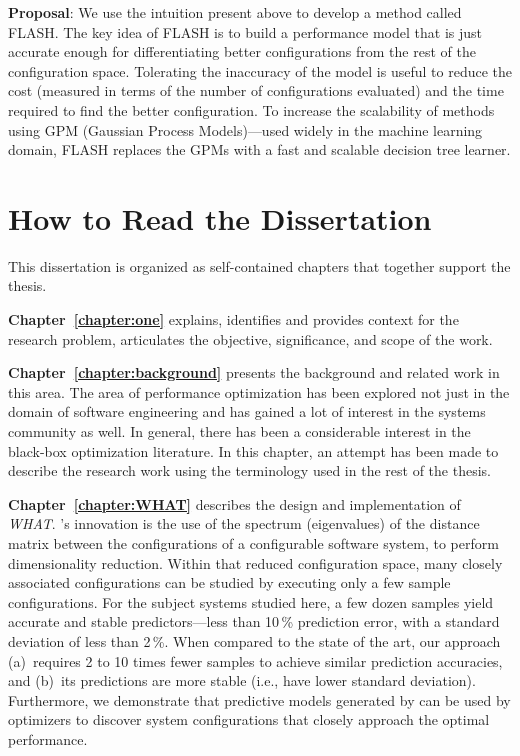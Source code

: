 \noindent\textbf{Proposal}:
We use the intuition present above to develop a method called FLASH.
The key idea of FLASH is to build a performance model
that is just accurate enough for differentiating better configurations
from the rest of the configuration space. Tolerating
the inaccuracy of the model is useful to reduce the cost
(measured in terms of the number of configurations evaluated)
and the time required to find the better configuration.
To increase the scalability of methods using GPM (Gaussian Process Models)---used widely in the machine learning domain, FLASH
replaces the GPMs with a fast and scalable decision tree learner.





\section{How to Read the Dissertation}
This dissertation is organized as self-contained chapters that together support
the thesis.

\textbf{Chapter~\ref{chapter:one}} explains, identifies and provides context for the research problem, articulates the objective, significance, and scope of the work.

\textbf{Chapter~\ref{chapter:background}} presents the background and related work in this area. The area of performance optimization has been explored not just in the domain of software engineering and has gained a lot of interest in the systems community as well. In general, there has been a considerable interest in the black-box optimization literature. In this chapter, an attempt has been made to describe the research work using the terminology used in the rest of the thesis.

\textbf{Chapter~\ref{chapter:WHAT}} describes the design and implementation
of \emph{WHAT}.
{\what}'s innovation is  
the use of the spectrum (eigenvalues) of the distance matrix
between the configurations of a configurable software system, to perform dimensionality reduction. Within that
reduced configuration space, many closely associated configurations can be studied
by executing only a few sample configurations. For the subject systems studied
here, a few dozen samples yield accurate and stable predictors---less than 10\,\% prediction error, with a standard deviation of less than 2\,\%.  
When compared to the state of the art, our approach (a)~requires 
2 to 10 times fewer samples to achieve similar prediction accuracies,
and (b)~its predictions are  more stable (i.e., have lower standard
deviation). 
Furthermore, we demonstrate that predictive models generated by
\what can be used by optimizers to discover system configurations that closely approach the optimal performance.



